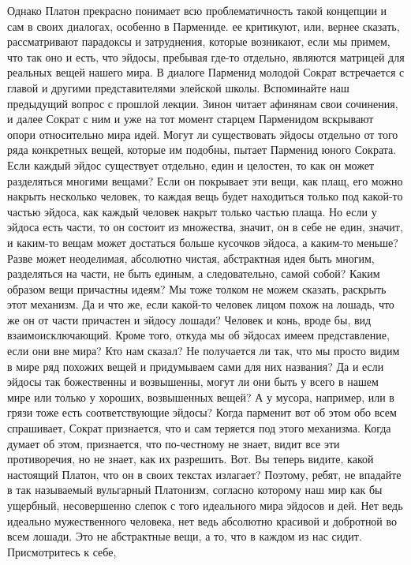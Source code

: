 Однако Платон прекрасно понимает всю проблематичность
такой концепции и сам в своих диалогах, особенно в Пармениде. ее критикуют, или,
вернее сказать, рассматривают парадоксы и затруднения, которые возникают, если
мы примем, что так оно и есть, что эйдосы, пребывая где-то отдельно, являются
матрицей для реальных вещей нашего мира. В диалоге Парменид молодой Сократ
встречается с главой и другими представителями элейской школы. Вспоминайте наш
предыдущий вопрос с прошлой лекции. Зинон читает афинянам свои сочинения, и
далее Сократ с ним и уже на тот момент старцем Парменидом вскрывают опори
относительно мира идей. Могут ли существовать эйдосы отдельно от того ряда
конкретных вещей, которые им подобны, пытает Парменид юного Сократа. Если каждый
эйдос существует отдельно, един и целостен, то как он может разделяться многими
вещами? Если он покрывает эти вещи, как плащ, его можно накрыть несколько
человек, то каждая вещь будет находиться только под какой-то частью эйдоса, как
каждый человек накрыт только частью плаща. Но если у эйдоса есть части, то он
состоит из множества, значит, он в себе не един, значит, и каким-то вещам может
достаться больше кусочков эйдоса, а каким-то меньше? Разве может неоделимая,
абсолютно чистая, абстрактная идея быть многим, разделяться на части, не быть
единым, а следовательно, самой собой? Каким образом вещи причастны идеям? Мы
тоже толком не можем сказать, раскрыть этот механизм. Да и что же, если какой-то
человек лицом похож на лошадь, что же он от части причастен и эйдосу лошади?
Человек и конь, вроде бы, вид взаимоисключающий. Кроме того, откуда мы об
эйдосах имеем представление, если они вне мира? Кто нам сказал? Не получается ли
так, что мы просто видим в мире ряд похожих вещей и придумываем сами для них
названия? Да и если эйдосы так божественны и возвышенны, могут ли они быть у
всего в нашем мире или только у хороших, возвышенных вещей? А у мусора,
например, или в грязи тоже есть соответствующие эйдосы? Когда парменит вот об
этом обо всем спрашивает, Сократ признается, что и сам теряется под этого
механизма. Когда думает об этом, признается, что по-честному не знает, видит все
эти противоречия, но не знает, как их разрешить. Вот. Вы теперь видите, какой
настоящий Платон, что он в своих текстах излагает? Поэтому, ребят, не впадайте в
так называемый вульгарный Платонизм, согласно которому наш мир как бы ущербный,
несовершенно слепок с того идеального мира эйдосов и дей. Нет ведь идеально
мужественного человека, нет ведь абсолютно красивой и добротной во всем лошади.
Это не абстрактные вещи, а то, что в каждом из нас сидит. Присмотритесь к себе,
